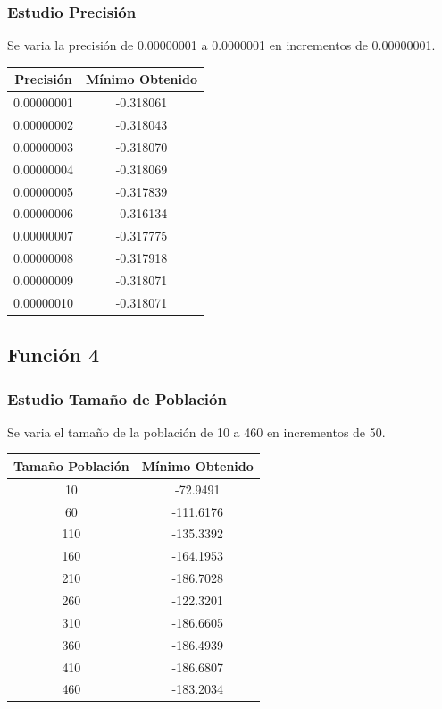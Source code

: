\documentclass[12pt]{article}
\begin{document}
\subsubsection*{Estudio Precisión}
	Se varia la precisión de 0.00000001 a 0.0000001 en incrementos de 0.00000001.
\begin{table}[H]
\begin{center}
\begin{tabular}{|cc|} \hline
Precisión & Mínimo Obtenido \\  \hline
0.00000001 & -0.318061 \\ 
0.00000002 & -0.318043 \\ 
0.00000003 & -0.318070 \\
0.00000004 & -0.318069 \\
0.00000005 & -0.317839 \\
0.00000006 & -0.316134 \\
0.00000007 & -0.317775 \\
0.00000008 & -0.317918 \\ 
0.00000009 & -0.318071 \\
0.00000010 & -0.318071 \\  \hline
\end{tabular}
\end{center}
\end{table}

\subsection{Función 4}
\subsubsection*{Estudio Tamaño de Población}
	Se varia el tamaño de la población de 10 a 460 en incrementos de 50.
\begin{table}[H]
\begin{center}
\begin{tabular}{|cc|} \hline
Tamaño Población & Mínimo Obtenido \\  \hline
10  & -72.9491 \\ 
60  & -111.6176 \\ 
110 & -135.3392 \\
160 & -164.1953 \\
210 & -186.7028 \\
260 & -122.3201 \\
310 & -186.6605 \\
360 & -186.4939 \\ 
410 & -186.6807 \\
460 & -183.2034 \\  \hline
\end{tabular}
\end{center}
\end{table}
 
\end{document}
